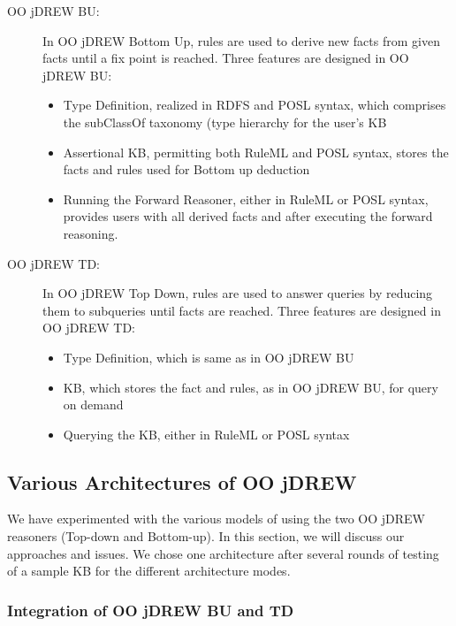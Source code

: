 \begin{description}
  \item[OO jDREW BU:] In OO jDREW Bottom Up, rules are used to derive new facts
from given facts until a fix point is reached. Three features are
designed in OO jDREW BU: 
\begin{itemize}
\item Type Definition, realized in RDFS and POSL syntax, which comprises the subClassOf taxonomy (type hierarchy for the user's KB
\item Assertional KB, permitting both RuleML and POSL syntax, stores the facts and rules used for Bottom up deduction
\item Running the Forward Reasoner, either in RuleML or POSL syntax, provides users with all derived facts and 
after executing the forward reasoning.
\end{itemize}
\end{description}

\begin{description}
\item[OO jDREW TD:] In OO jDREW Top Down, rules are used to answer queries by
reducing them to subqueries until facts are reached.
Three features are designed in OO jDREW TD: 
\begin{itemize}
\item Type Definition, which is same as in OO jDREW BU 
\item KB, which stores the fact and rules, as in OO jDREW BU, for query on demand
\item Querying the KB, either in RuleML or POSL syntax
\end{itemize}
\end{description}


\subsection{Various Architectures of OO jDREW}

\hspace{0.3in}We have experimented with the various models of using the two OO jDREW reasoners (Top-down and Bottom-up). In this section, we will discuss our approaches and issues. We chose one architecture after several rounds of testing of a sample KB for the different architecture modes.

\subsubsection{ Integration of OO jDREW BU and TD}

